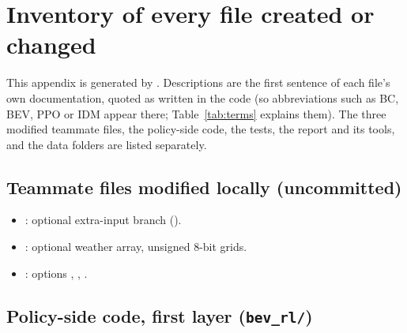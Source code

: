 \section{Inventory of every file created or changed}\label{app:inventory}
This appendix is generated by . Descriptions are the first sentence of each file's own documentation, quoted as written in the code (so abbreviations such as BC, BEV, PPO or IDM appear there; Table~\ref{tab:terms} explains them). The three modified teammate files, the policy-side code, the tests, the report and its tools, and the data folders are listed separately.
\subsection{Teammate files modified locally (uncommitted)}\begin{itemize}\item {}: optional extra-input branch (). \item {}: optional weather array, unsigned 8-bit grids. \item {}: options , , .\end{itemize}
\subsection{Policy-side code, first layer (\texttt{bev\_rl/})}


